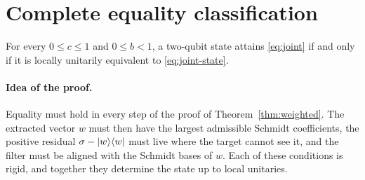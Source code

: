 \section{Complete equality classification}\label{sec:equality}
\begin{theorem}\label{thm:joint-equality}
For every $0\le c\le1$ and $0\le b<1$, a two-qubit state attains \eqref{eq:joint} if and only if it is locally unitarily equivalent to \eqref{eq:joint-state}.
\end{theorem}
\paragraph{Idea of the proof.} Equality must hold in every step of the
proof of Theorem~\ref{thm:weighted}. The extracted vector $w$ must then have
the largest admissible Schmidt coefficients, the positive residual
$\sigma-\lvert w\rangle\langle w\rvert$ must live where the target cannot see it, and the filter
must be aligned with the Schmidt bases of $w$. Each of these conditions is
rigid, and together they determine the state up to local unitaries.

